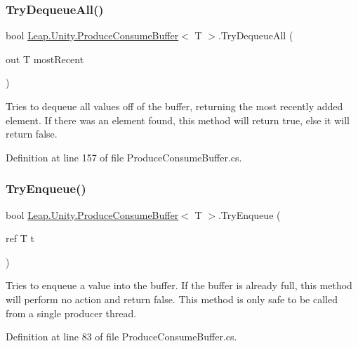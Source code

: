 \subsubsection{\texorpdfstring{TryDequeueAll()}{TryDequeueAll()}}
{\footnotesize\ttfamily bool \mbox{\hyperlink{class_leap_1_1_unity_1_1_produce_consume_buffer}{Leap.\+Unity.\+Produce\+Consume\+Buffer}}$<$ T $>$.Try\+Dequeue\+All (\begin{DoxyParamCaption}\item[{out T}]{most\+Recent }\end{DoxyParamCaption})}



Tries to dequeue all values off of the buffer, returning the most recently added element. If there was an element found, this method will return true, else it will return false. 



Definition at line 157 of file Produce\+Consume\+Buffer.\+cs.

\mbox{\label{class_leap_1_1_unity_1_1_produce_consume_buffer_a2c3eaa1d8aafc68cf6d8d020ae47e4de}} 
\subsubsection{\texorpdfstring{TryEnqueue()}{TryEnqueue()}\hspace{0.1cm}{\footnotesize\ttfamily [1/2]}}
{\footnotesize\ttfamily bool \mbox{\hyperlink{class_leap_1_1_unity_1_1_produce_consume_buffer}{Leap.\+Unity.\+Produce\+Consume\+Buffer}}$<$ T $>$.Try\+Enqueue (\begin{DoxyParamCaption}\item[{ref T}]{t }\end{DoxyParamCaption})}



Tries to enqueue a value into the buffer. If the buffer is already full, this method will perform no action and return false. This method is only safe to be called from a single producer thread. 



Definition at line 83 of file Produce\+Consume\+Buffer.\+cs.

\mbox{\label{class_leap_1_1_unity_1_1_produce_consume_buffer_ae80a5be8a8e07eb8b922fdfca764f1da}} 
